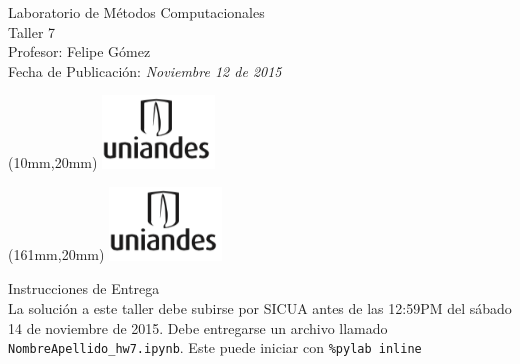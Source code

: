 \documentclass[11pt,letterpaper]{exam}
\begin{document}
\begin{center}
{\Large Laboratorio de Métodos Computacionales} \\
Taller 7 \\
Profesor: Felipe G\'omez\\
Fecha de Publicación: {\small \it Noviembre 12 de 2015}\\
\end{center}

\begin{textblock*}{40mm}(10mm,20mm)
  \includegraphics[width=3cm]{logoUniandes.png}
\end{textblock*}

\begin{textblock*}{40mm}(161mm,20mm)
  \includegraphics[width=3cm]{logoUniandes.png}
\end{textblock*}

\vspace{0.5cm}

{\Large Instrucciones de Entrega}\\

\noindent
La solución a este taller debe subirse por SICUA antes de las 12:59PM
del s\'abado 14 de noviembre de 2015. Debe entregarse un archivo llamado
\verb"NombreApellido_hw7.ipynb". Este puede iniciar con \verb"%pylab inline"
\end{document}
